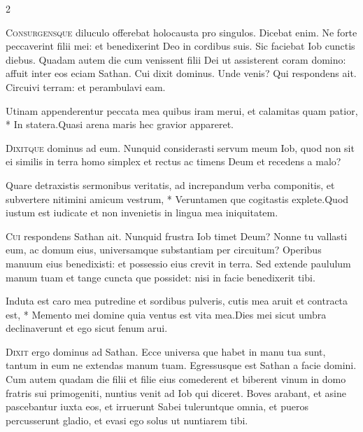\begin{multicols*}{2}
\begin{responsory}
\end{responsory}%
\lettrine[lines=2]{\zallmancaps \color{Blue} C}{onsurgensque} diluculo offerebat holocausta pro singulos. Dicebat enim. Ne forte peccaverint filii mei: et benedixerint Deo in cordibus suis. Sic faciebat Iob cunctis diebus. Quadam autem die cum venissent filii Dei ut assisterent coram domino: affuit inter eos eciam Sathan. Cui dixit dominus. Unde venis? Qui respondens ait. Circuivi terram: et perambulavi eam.
\begin{responsory-doxology}
{Utinam appenderentur peccata mea quibus iram merui, et calamitas quam patior, * In statera.}{Quasi arena maris hec gravior appareret.}
\end{responsory-doxology}%
\lettrine[lines=2]{\zallmancaps \color{Red} D}{ixitque} dominus ad eum. Nunquid considerasti servum meum Iob, quod non sit ei similis in terra homo simplex et rectus ac timens Deum et recedens a malo?
\begin{responsory}
{Quare detraxistis sermonibus veritatis, ad increpandum verba componitis, et subvertere nitimini amicum vestrum, * Veruntamen que cogitastis explete.}{Quod iustum est iudicate et non invenietis in lingua mea iniquitatem.}
\end{responsory}%
\lettrine[lines=2]{\zallmancaps \color{Blue} C}{ui} respondens Sathan ait. Nunquid frustra Iob timet Deum? Nonne tu vallasti eum, ac domum eius, universamque substantiam per circuitum? Operibus manuum eius benedixisti: et possessio eius crevit in terra. Sed extende paululum manum tuam et tange cuncta que possidet: nisi in facie benedixerit tibi.
\begin{responsory}
{Induta est caro mea putredine et sordibus pulveris, cutis mea aruit et contracta est, * Memento mei domine quia ventus est vita mea.}{Dies mei sicut umbra declinaverunt et ego sicut fenum arui.}
\end{responsory}%
\lettrine[lines=2]{\zallmancaps \color{Red} D}{ixit} ergo dominus ad Sathan. Ecce universa que habet in manu tua sunt, tantum in eum ne extendas manum tuam. Egressusque est Sathan a facie domini. Cum autem quadam die filii et filie eius comederent et biberent vinum in domo fratris sui primogeniti, nuntius venit ad Iob qui diceret. Boves arabant, et asine pascebantur iuxta eos, et irruerunt Sabei tuleruntque omnia, et pueros percusserunt gladio, et evasi ego solus ut nuntiarem tibi.

\end{multicols*}
